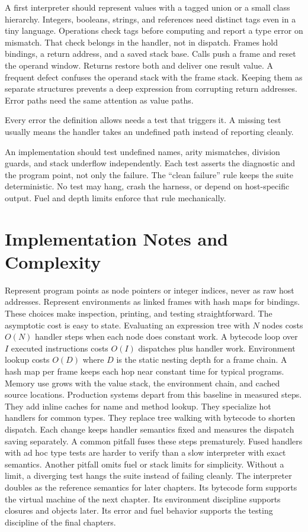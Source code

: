 A first interpreter should represent values with a tagged union or a small class hierarchy.
Integers, booleans, strings, and references need distinct tags even in a tiny language.
Operations check tags before computing and report a type error on mismatch.
That check belongs in the handler, not in dispatch.
Frames hold bindings, a return address, and a saved stack base.
Calls push a frame and reset the operand window.
Returns restore both and deliver one result value.
A frequent defect confuses the operand stack with the frame stack.
Keeping them as separate structures prevents a deep expression from corrupting return addresses.
Error paths need the same attention as value paths.
\begin{ccnote}
Every error the definition allows needs a test that triggers it.
A missing test usually means the handler takes an undefined path instead of reporting cleanly.
\end{ccnote}
An implementation should test undefined names, arity mismatches, division guards, and stack underflow independently.
Each test asserts the diagnostic and the program point, not only the failure.
The \enquote{clean failure} rule keeps the suite deterministic.
No test may hang, crash the harness, or depend on host-specific output.
Fuel and depth limits enforce that rule mechanically.

\section{Implementation Notes and Complexity}\label{sec:ch30-implementation}

Represent program points as node pointers or integer indices, never as raw host addresses.
Represent environments as linked frames with hash maps for bindings.
These choices make inspection, printing, and testing straightforward.
The asymptotic cost is easy to state.
Evaluating an expression tree with $N$ nodes costs $O(N)$ handler steps when each node does constant work.
A bytecode loop over $I$ executed instructions costs $O(I)$ dispatches plus handler work.
Environment lookup costs $O(D)$ where $D$ is the static nesting depth for a frame chain.
A hash map per frame keeps each hop near constant time for typical programs.
Memory use grows with the value stack, the environment chain, and cached source locations.
Production systems depart from this baseline in measured steps.
They add inline caches for name and method lookup.
They specialize hot handlers for common types.
They replace tree walking with bytecode to shorten dispatch.
Each change keeps handler semantics fixed and measures the dispatch saving separately.
A common pitfall fuses these steps prematurely.
Fused handlers with ad hoc type tests are harder to verify than a slow interpreter with exact semantics.
Another pitfall omits fuel or stack limits for simplicity.
Without a limit, a diverging test hangs the suite instead of failing cleanly.
The interpreter doubles as the reference semantics for later chapters.
Its bytecode form supports the virtual machine of the next chapter.
Its environment discipline supports closures and objects later.
Its error and fuel behavior supports the testing discipline of the final chapters.

